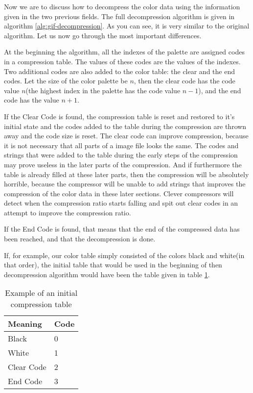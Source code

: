 Now we are to discuss how to decompress the color data using the
information given in the two previous fields. The full decompression
algorithm is given in algorithm \ref{alg:gif-decompression}. As you
can see, it is very similar to the original \lzw algorithm. Let us
now go through the most important differences.

At the beginning the algorithm, all the indexes of the palette are
assigned codes in a compression table. The values of these codes are
the values of the indexes. Two additional codes are also added to the
color table: the clear and the end codes. Let the size of the color
palette be $n$, then the clear code has the code value $n$(the highest
index in the palette has the code value $n-1$), and the end code has
the value $n+1$.

If the Clear Code is found, the compression table is reset and
restored to it's initial state and the codes added to the table during
the compression are thrown away and the code size is reset. The clear
code can improve compression, because it is not necessary that all
parts of a image file looks the same. The codes and strings that were
added to the table during the early steps of the compression may prove
useless in the later parts of the compression. And if furthermore the
table is already filled at these later parts, then the compression
will be absolutely horrible, because the compressor will be unable to
add strings that improves the compression of the color data in these
later sections. Clever \gif compressors will detect when the
compression ratio starts falling and spit out clear codes in an
attempt to improve the compression ratio.

If the End Code is found, that means that the end of the compressed
data has been reached, and that the decompression is done.

If, for example, our color table simply consisted of the colors black
and white(in that order), the initial table that would be used in the
beginning of then decompression algorithm would have been the table
given in table \ref{tab:example-gif-color-table}.

\begin{table}
  \centering
  \begin{tabular}{ll}
    \toprule
    Meaning & Code \\
    \midrule
    Black & 0 \\
    White & 1 \\
    Clear Code & 2 \\
    End Code & 3 \\
    \bottomrule
  \end{tabular}
  \caption{Example of an initial \gif compression table}
  \label{tab:example-gif-color-table}
\end{table}

